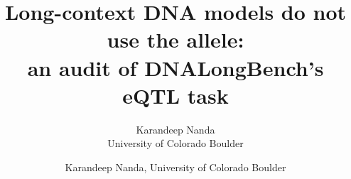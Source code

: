\makeatletter
\setlength{\@fptop}{0pt}
\setlength{\@fpsep}{14pt}
\setlength{\@fpbot}{0pt plus 1fil}
\makeatother
\setlength{\abovecaptionskip}{6pt}
\setlength{\belowcaptionskip}{0pt}

\newcommand{\refalt}{\texttt{refalt}}
\newcommand{\refcopy}{\texttt{ref\_copy}}
\newcommand{\diffonly}{\texttt{diff\_only}}

\title{Long-context DNA models do not use the allele:\\
an audit of DNALongBench's eQTL task}

\ifdefined\RECOMB
  \author{Karandeep Nanda\\\normalsize University of Colorado Boulder}
\else
  \author{Karandeep Nanda, \normalsize University of Colorado Boulder}
\fi
\date{}

